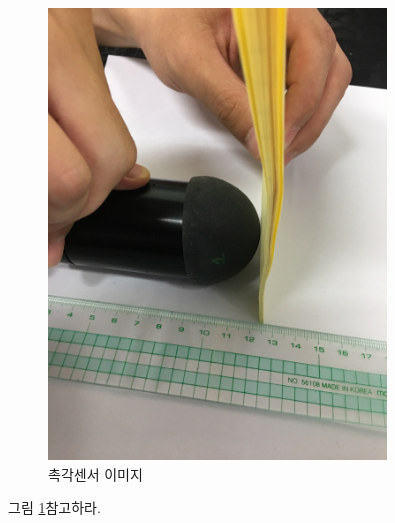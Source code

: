\documentclass[•]{oblivoir}
\begin{document}
\begin{figure}[t]
\centering
\includegraphics[width=0.8\textwidth]{img03}
\caption{촉각센서 이미지}\label{fig:1}
\end{figure}

\lipsum

그림 \ref{fig:1}\를 참고하라.
\end{document}
